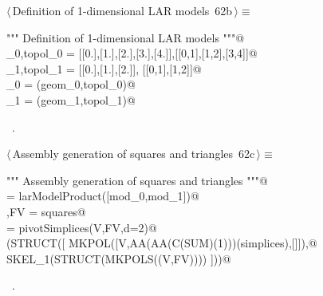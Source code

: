 \documentclass[11pt,oneside]{article}    %
\begin{document}
\begin{flushleft} \small \label{scrap119}
\protect{}$\langle\,$Definition of 1-dimensional LAR models\nobreak\ {\footnotesize 62b}$\,\rangle\equiv$
\vspace{-1ex}
\begin{list}{}{} \item
\mbox{}\verb@""" Definition of 1-dimensional LAR models  """@\\
\mbox{}\verb@geom_0,topol_0 = [[0.],[1.],[2.],[3.],[4.]],[[0,1],[1,2],[3,4]]@\\
\mbox{}\verb@geom_1,topol_1 = [[0.],[1.],[2.]], [[0,1],[1,2]]@\\
\mbox{}\verb@mod_0 = (geom_0,topol_0)@\\
\mbox{}\verb@mod_1 = (geom_1,topol_1)@\\
\mbox{}\verb@@{\NWsep}
\end{list}
\vspace{-1ex}
\footnotesize\addtolength{\baselineskip}{-1ex}
\begin{list}{}{\setlength{\itemsep}{-\parsep}\setlength{\itemindent}{-\leftmargin}}
\item \NWtxtMacroRefIn\ .
\end{list}
\end{flushleft}

\begin{flushleft} \small \label{scrap120}
\protect{}$\langle\,$Assembly generation of squares and triangles\nobreak\ {\footnotesize 62c}$\,\rangle\equiv$
\vspace{-1ex}
\begin{list}{}{} \item
\mbox{}\verb@""" Assembly generation of squares and triangles """@\\
\mbox{}\verb@squares = larModelProduct([mod_0,mod_1])@\\
\mbox{}\verb@V,FV = squares@\\
\mbox{}\verb@simplices = pivotSimplices(V,FV,d=2)@\\
\mbox{}\verb@VIEW(STRUCT([ MKPOL([V,AA(AA(C(SUM)(1)))(simplices),[]]),@\\
\mbox{}\verb@              SKEL_1(STRUCT(MKPOLS((V,FV)))) ]))@\\
\mbox{}\verb@@{\NWsep}
\end{list}
\vspace{-1ex}
\footnotesize\addtolength{\baselineskip}{-1ex}
\begin{list}{}{\setlength{\itemsep}{-\parsep}\setlength{\itemindent}{-\leftmargin}}
\item \NWtxtMacroRefIn\ .
\end{list}
\end{flushleft}
\end{document}
